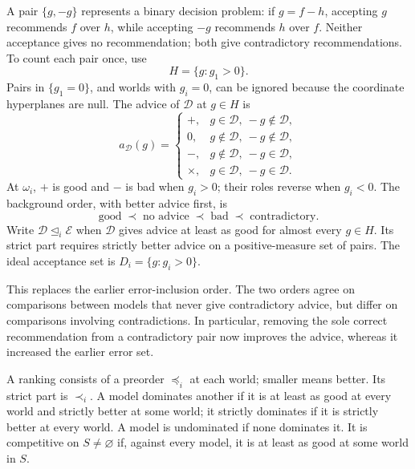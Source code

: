 \documentclass[11pt]{article}
\theoremstyle{remark}
\newcommand{\Dscr}{\mathcal D}
\newcommand{\Escr}{\mathcal E}
\begin{document}
A pair $\{g,-g\}$ represents a binary decision problem: if $g=f-h$, accepting
$g$ recommends $f$ over $h$, while accepting $-g$ recommends $h$ over $f$.
Neither acceptance gives no recommendation; both give contradictory
recommendations. To count each pair once, use
\[
 H=\{g:g_1>0\}.
\]
Pairs in $\{g_1=0\}$, and worlds with $g_i=0$, can be ignored because the
coordinate hyperplanes are null. The advice of $\Dscr$ at $g\in H$ is
\[
 a_{\Dscr}(g)=
 \begin{cases}
 +,&g\in\Dscr,\ -g\notin\Dscr,\\
 0,&g\notin\Dscr,\ -g\notin\Dscr,\\
 -,&g\notin\Dscr,\ -g\in\Dscr,\\
 \times,&g\in\Dscr,\ -g\in\Dscr.
 \end{cases}
\]
At $\omega_i$, $+$ is good and $-$ is bad when $g_i>0$; their roles reverse
when $g_i<0$. The background order, with better advice first, is
\begin{equation}
 \boxed{\text{good}\;\prec\;\text{no advice}\;\prec\;\text{bad}\;\prec\;\text{contradictory}.}
 \label{eq:advice-order}
\end{equation}
Write $\Dscr\unlhd_i\Escr$ when $\Dscr$ gives advice at least as good for almost
every $g\in H$. Its strict part requires strictly better advice on a
positive-measure set of pairs. The ideal acceptance set is
$D_i=\{g:g_i>0\}$.

This replaces the earlier error-inclusion order. The two orders agree on
comparisons between models that never give contradictory advice, but differ
on comparisons involving contradictions. In particular, removing the sole
correct recommendation from a contradictory pair now improves the advice,
whereas it increased the earlier error set.

A ranking consists of a preorder $\preceq_i$ at each world; smaller means
better. Its strict part is $\prec_i$. A model dominates another if it is at
least as good at every world and strictly better at some world; it strictly
dominates if it is strictly better at every world. A model is undominated
if none dominates it. It is competitive on $S\ne\varnothing$ if, against
every model, it is at least as good at some world in $S$.
\end{document}
